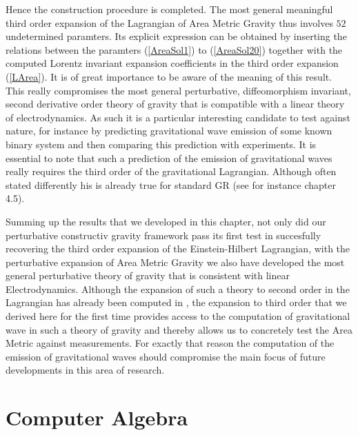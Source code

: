 \documentclass[a4paper,12pt, DIV=14, BCOR=5mm, twoside, headsepline, numbers=noenddot]{scrbook}
\begin{document}
Hence the construction procedure is completed. The most general meaningful third order expansion of the Lagrangian of Area Metric Gravity thus involves $52$ undetermined paramters. Its explicit expression can be obtained by inserting the relations between the paramters (\ref{AreaSol1}) to (\ref{AreaSol20}) together with the computed Lorentz invariant expansion coefficients in the third order expansion (\ref{LArea}). It is of great importance to be aware of the meaning of this result. This really compromises the most general perturbative, diffeomorphism invariant, second derivative order theory of gravity that is compatible with a linear theory of electrodynamics. As such it is a particular interesting candidate to test against nature, for instance by predicting gravitational wave emission of some known binary system and then comparing this prediction with experiments. It is essential to note that such a prediction of the emission of gravitational waves really requires the third order of the gravitational Lagrangian. Although often stated differently his is already true for standard GR (see for instance \cite{1984grra.book.....S} chapter 4.5).

Summing up the results that we developed in this chapter, not only did our perturbative constructiv gravity framework pass its first test in succesfully recovering the third order expansion of the Einstein-Hilbert Lagrangian, with the perturbative expansion of Area Metric Gravity we also have developed the most general perturbative theory of gravity that is consistent with linear Electrodynamics. Although the expansion of such a theory to second order in the Lagrangian has already been computed in \cite{2017arXiv170803870S}, the expansion to third order that we derived here for the first time provides access to the computation of gravitational wave in such a theory of gravity and thereby allows us to concretely test the Area Metric against measurements. For exactly that reason the computation of the emission of gravitational waves should compromise the main focus of future developments in this area of research. 

\chapter{Computer Algebra}\label{computerAlg}
\end{document}
